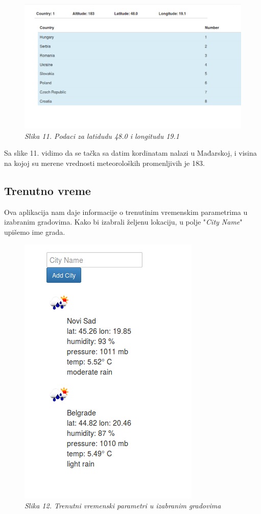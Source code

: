 \documentclass[12pt]{article}
\begin{document}
\begin{figure}[!htb]
	\centering
	\includegraphics[width=0.7\linewidth]{data.png}
	\caption*{\textsl{Slika 11. Podaci za latidudu 48.0 i longitudu 19.1}}
\end{figure}
Sa slike 11. vidimo da se tačka sa datim kordinatam nalazi u Mađarskoj, i visina na kojoj su merene vrednosti meteoroloških promenljivih je 183.

\subsection{Trenutno vreme}
Ova aplikacija nam daje informacije o trenutinim vremenskim parametrima u izabranim gradovima. Kako bi izabrali željenu lokaciju, u polje "\textit{City Name}" upišemo ime grada.
\begin{figure}[!htb]
	\centering
	\includegraphics[width=0.5\linewidth]{vreme.png}
	\caption*{\textsl{Slika 12. Trenutni vremenski parametri u izabranim gradovima}}
\end{figure}
\end{document}
